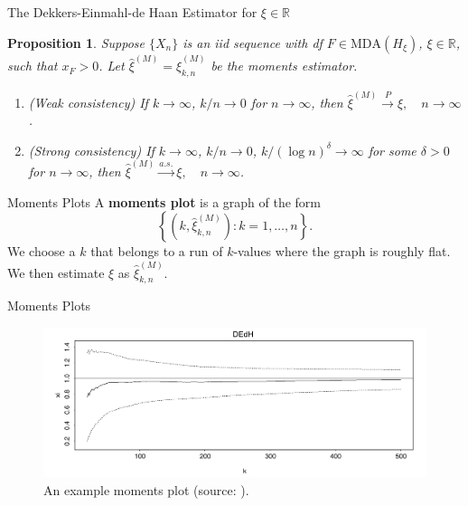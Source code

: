 \documentclass{beamer}
\newcommand{\MDA}{\text{MDA}}
\newtheorem{proposition}{Proposition}
\begin{document}
\begin{frame}{The Dekkers-Einmahl-de Haan Estimator for $\xi \in \mathbb{R}$}
    \begin{proposition}
        Suppose $\{X_n\}$ is an iid sequence with df $F \in \MDA(H_{\xi})$, $\xi \in \mathbb{R}$, such that $x_F > 0$. Let $\hat{\xi}^{(M)} = \hat{\xi}_{k, n}^{(M)}$ be the moments estimator.
        \begin{enumerate}
            \item[(a)] (Weak consistency) If $k \to \infty$, $k / n \to 0$ for $n \to \infty$, then $\hat{\xi}^{(M)} \xrightarrow{P} \xi, \quad n \to \infty$.
            \item[(b)] (Strong consistency) If $k \to \infty$, $k / n \to 0$, $k /(\log n)^{\delta} \to \infty$ for some $\delta > 0$ for $n \to \infty$, then 
            $\hat{\xi}^{(M)} \xrightarrow{a.s.} \xi, \quad n \to \infty$.
        \end{enumerate}
    \end{proposition}    
\end{frame}

\begin{frame}{Moments Plots}
    A \textbf{moments plot} is a graph of the form
    \[
    \left\{\left(k, \hat{\xi}_{k, n}^{(M)}\right) : k = 1, \ldots, n\right\}.
    \]
    We choose a $k$ that belongs to a run of $k$-values where the graph is roughly flat. We then estimate $\xi$ as $\hat{\xi}_{k, n}^{(M)}$.
\end{frame}

\begin{frame}{Moments Plots}
    \begin{figure}
        \centering
        \includegraphics[scale=0.35]{moments_plot.png}
        \caption{An example moments plot (source: \cite{embrechts_et_al_1997}).}
        \label{fig:moments_plot}
    \end{figure}
\end{frame}
\end{document}
